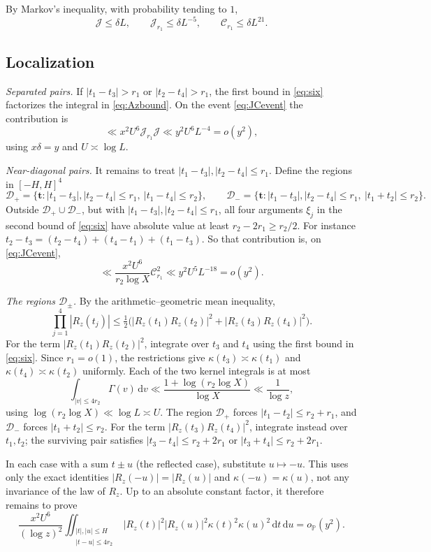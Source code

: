\documentclass[11pt]{amsart}
\theoremstyle{remark}
\numberwithin{equation}{section}
\renewcommand{\P}{\mathbb{P}}
\newcommand{\dd}{\,\mathrm{d}}
\newcommand{\bt}{\mathbf{t}}
\begin{document}
By Markov's inequality, with probability tending to $1$,
\begin{equation}\label{eq:JCevent}
\mathcal J\le\delta L,\qquad\mathcal J_{r_1}\le\delta L^{-5},\qquad\mathcal C_{r_1}\le\delta L^{21}.
\end{equation}

\subsection{Localization}
\emph{Separated pairs.} If $|t_1-t_3|>r_1$ or $|t_2-t_4|>r_1$, the first bound in \eqref{eq:six} factorizes the integral in \eqref{eq:Azbound}. On the event \eqref{eq:JCevent} the contribution is
\[
\ll x^2U^6\mathcal J_{r_1}\mathcal J\ll y^2U^6L^{-4}=o(y^2),
\]
using $x\delta=y$ and $U\asymp\log L$.

\emph{Near-diagonal pairs.} It remains to treat $|t_1-t_3|,|t_2-t_4|\le r_1$. Define the regions in $[-H,H]^4$
\[
\mathcal D_+=\{\bt:|t_1-t_3|,|t_2-t_4|\le r_1,\ |t_1-t_4|\le r_2\},\qquad\mathcal D_-=\{\bt:|t_1-t_3|,|t_2-t_4|\le r_1,\ |t_1+t_2|\le r_2\}.
\]
Outside $\mathcal D_+\cup\mathcal D_-$, but with $|t_1-t_3|,|t_2-t_4|\le r_1$, all four arguments $\xi_j$ in the second bound of \eqref{eq:six} have absolute value at least $r_2-2r_1\ge r_2/2$. For instance $t_2-t_3=(t_2-t_4)+(t_4-t_1)+(t_1-t_3)$. So that contribution is, on \eqref{eq:JCevent},
\[
\ll\frac{x^2U^6}{r_2\log X}\mathcal C_{r_1}^2\ll y^2U^5L^{-18}=o(y^2).
\]

\emph{The regions $\mathcal D_\pm$.} By the arithmetic--geometric mean inequality,
\[
\prod_{j=1}^4|R_z(t_j)|\le\tfrac12\bigl(|R_z(t_1)R_z(t_2)|^2+|R_z(t_3)R_z(t_4)|^2\bigr).
\]
For the term $|R_z(t_1)R_z(t_2)|^2$, integrate over $t_3$ and $t_4$ using the first bound in \eqref{eq:six}. Since $r_1=o(1)$, the restrictions give $\kappa(t_3)\asymp\kappa(t_1)$ and $\kappa(t_4)\asymp\kappa(t_2)$ uniformly. Each of the two kernel integrals is at most
\begin{equation}\label{eq:Gammaint}
\int_{|v|\le4r_2}\Gamma(v)\dd v\ll\frac{1+\log(r_2\log X)}{\log X}\ll\frac1{\log z},
\end{equation}
using $\log(r_2\log X)\ll\log L\asymp U$. The region $\mathcal D_+$ forces $|t_1-t_2|\le r_2+r_1$, and $\mathcal D_-$ forces $|t_1+t_2|\le r_2$. For the term $|R_z(t_3)R_z(t_4)|^2$, integrate instead over $t_1,t_2$; the surviving pair satisfies $|t_3-t_4|\le r_2+2r_1$ or $|t_3+t_4|\le r_2+2r_1$.

In each case with a sum $t\pm u$ (the reflected case), substitute $u\mapsto-u$. This uses only the exact identities $|R_z(-u)|=|R_z(u)|$ and $\kappa(-u)=\kappa(u)$, not any invariance of the law of $R_z$. Up to an absolute constant factor, it therefore remains to prove
\begin{equation}\label{eq:closegoal}
\frac{x^2U^6}{(\log z)^2}\iint_{\substack{|t|,|u|\le H\\|t-u|\le4r_2}}|R_z(t)|^2|R_z(u)|^2\kappa(t)^2\kappa(u)^2\dd t\dd u=o_\P(y^2).
\end{equation}
\end{document}
